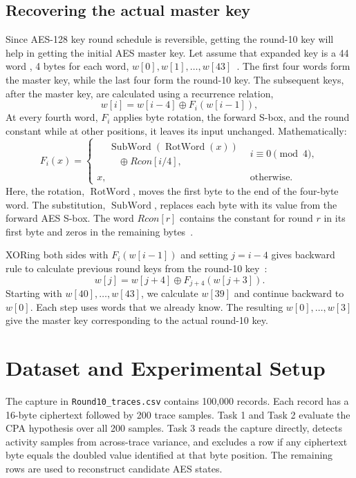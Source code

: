 \documentclass[conference,10pt,letterpaper]{IEEEtran}
\begin{document}
\subsection{Recovering the actual master key}
Since AES-128 key round schedule is reversible, getting the round-10 key will help in getting the initial AES master key. Let assume that expanded key is a 44 word , 4 bytes for each word, $w[0], w[1], \ldots,w[43]$~\cite{cse-inversion}. The first four words form the master key, while the last four form the round-10 key. The subsequent keys, after the master key, are calculated using a recurrence relation,
\begin{equation}
w[i]=w[i-4]\oplus F_i(w[i-1]),
\label{eq:forward-schedule}
\end{equation}
At every fourth word, $F_i$ applies byte rotation, the forward S-box, and the round constant while at other positions, it leaves its input unchanged. Mathematically:
\begin{equation}
F_i(x)=
\begin{cases}
\begin{aligned}
&\operatorname{SubWord}(\operatorname{RotWord}(x))\\
&\quad\oplus Rcon[i/4],
\end{aligned}
& i\equiv0\pmod4,\\
x, & \text{otherwise}.
\end{cases}
\label{eq:schedule-transform}
\end{equation}
Here, the rotation, $\operatorname{RotWord}$, moves the first byte to the end of the four-byte word. The substitution, $\operatorname{SubWord}$, replaces each byte with its value from the forward AES S-box. The word $Rcon[r]$ contains the constant for round $r$ in its first byte and zeros in the remaining bytes~\cite{fips197}.

XORing both sides with $F_i(w[i-1])$ and setting $j=i-4$ gives backward rule to calculate previous round keys from the round-10 key~\cite{cse-inversion}:
\begin{equation}
w[j]=w[j+4]\oplus F_{j+4}(w[j+3]).
\label{eq:backward-schedule}
\end{equation}
Starting with $w[40],\ldots,w[43]$, we calculate $w[39]$ and continue backward to $w[0]$. Each step uses words that we already know. The resulting $w[0],\ldots,w[3]$ give the master key corresponding to the actual round-10 key.

\section{Dataset and Experimental Setup}
The capture in \texttt{Round10\_traces.csv} contains 100,000 records. Each record has a 16-byte ciphertext followed by 200 trace samples. Task 1 and Task 2 evaluate the CPA hypothesis over all 200 samples. Task 3 reads the capture directly, detects activity samples from across-trace variance, and excludes a row if any ciphertext byte equals the doubled value identified at that byte position. The remaining rows are used to reconstruct candidate AES states.
\end{document}
